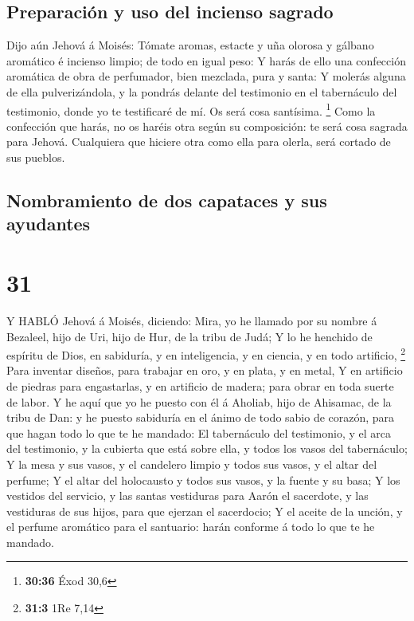 \hypertarget{preparaciuxf3n-y-uso-del-incienso-sagrado}{%
\subsection{Preparación y uso del incienso
sagrado}\label{preparaciuxf3n-y-uso-del-incienso-sagrado}}

 Dijo aún Jehová á Moisés: Tómate aromas, estacte y uña
olorosa y gálbano aromático é incienso limpio; de todo en igual peso:
 Y harás de ello una confección aromática de obra de
perfumador, bien mezclada, pura y santa:  Y molerás alguna
de ella pulverizándola, y la pondrás delante del testimonio en el
tabernáculo del testimonio, donde yo te testificaré de mí. Os será cosa
santísima. \footnote{\textbf{30:36} Éxod 30,6}  Como la
confección que harás, no os haréis otra según su composición: te será
cosa sagrada para Jehová.  Cualquiera que hiciere otra como
ella para olerla, será cortado de sus pueblos.

\hypertarget{nombramiento-de-dos-capataces-y-sus-ayudantes}{%
\subsection{Nombramiento de dos capataces y sus
ayudantes}\label{nombramiento-de-dos-capataces-y-sus-ayudantes}}

\hypertarget{section-30}{%
\section{31}\label{section-30}}

 Y HABLÓ Jehová á Moisés, diciendo:  Mira, yo he
llamado por su nombre á Bezaleel, hijo de Uri, hijo de Hur, de la tribu
de Judá;  Y lo he henchido de espíritu de Dios, en
sabiduría, y en inteligencia, y en ciencia, y en todo artificio,
\footnote{\textbf{31:3} 1Re 7,14}  Para inventar diseños,
para trabajar en oro, y en plata, y en metal,  Y en
artificio de piedras para engastarlas, y en artificio de madera; para
obrar en toda suerte de labor.  Y he aquí que yo he puesto
con él á Aholiab, hijo de Ahisamac, de la tribu de Dan: y he puesto
sabiduría en el ánimo de todo sabio de corazón, para que hagan todo lo
que te he mandado:  El tabernáculo del testimonio, y el arca
del testimonio, y la cubierta que está sobre ella, y todos los vasos del
tabernáculo;  Y la mesa y sus vasos, y el candelero limpio y
todos sus vasos, y el altar del perfume;  Y el altar del
holocausto y todos sus vasos, y la fuente y su basa;  Y los
vestidos del servicio, y las santas vestiduras para Aarón el sacerdote,
y las vestiduras de sus hijos, para que ejerzan el sacerdocio;
 Y el aceite de la unción, y el perfume aromático para el
santuario: harán conforme á todo lo que te he mandado.

